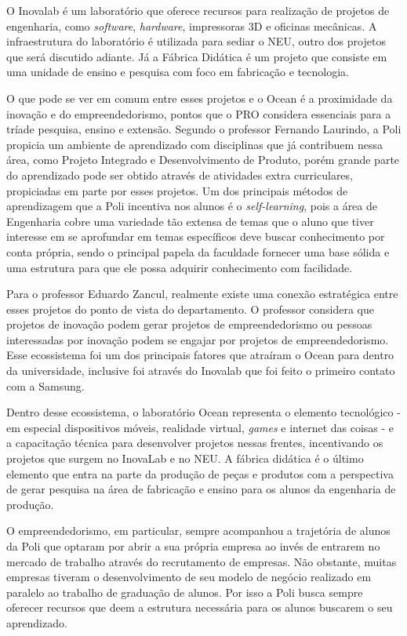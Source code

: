 O Inovalab é um laboratório que oferece recursos para realização de projetos de engenharia, como \textit{software}, \textit{hardware}, impressoras 3D e oficinas mecânicas. A infraestrutura do laboratório é utilizada para sediar o NEU, outro dos projetos que será discutido adiante. Já a Fábrica Didática é um projeto que consiste em uma unidade de ensino e pesquisa com foco em fabricação e tecnologia.

O que pode se ver em comum entre esses projetos e o Ocean é a proximidade da inovação e do empreendedorismo, pontos que o PRO considera essenciais para a tríade pesquisa, ensino e extensão. Segundo o professor Fernando Laurindo, a Poli propicia um ambiente de aprendizado com disciplinas que já contribuem nessa área, como Projeto Integrado e Desenvolvimento de Produto, porém grande parte do aprendizado pode ser obtido através de atividades extra curriculares, propiciadas em parte por esses projetos. Um dos principais métodos de aprendizagem que a Poli incentiva nos alunos é o \textit{self-learning}, pois a área de Engenharia cobre uma variedade tão extensa de temas que o aluno que tiver interesse em se aprofundar em temas específicos deve buscar conhecimento por conta própria, sendo o principal papela da faculdade fornecer uma base sólida e uma estrutura para que ele possa adquirir conhecimento com facilidade.

Para o professor Eduardo Zancul, realmente existe uma conexão estratégica entre esses projetos do ponto de vista do departamento. O professor considera que projetos de inovação podem gerar projetos de empreendedorismo ou pessoas interessadas por inovação podem se engajar por projetos de empreendedorismo. Esse ecossistema foi um dos principais fatores que atraíram o Ocean para dentro da universidade, inclusive foi através do Inovalab que foi feito o primeiro contato com a Samsung. 

Dentro desse ecossistema, o laboratório Ocean representa o elemento tecnológico - em especial dispositivos móveis, realidade virtual, \textit{games} e internet das coisas - e a capacitação técnica para desenvolver projetos nessas frentes, incentivando os projetos que surgem no InovaLab e no NEU. A fábrica didática é o último elemento que entra na parte da produção de peças e produtos com a perspectiva de gerar pesquisa na área de fabricação e ensino para os alunos da engenharia de produção.

O empreendedorismo, em particular, sempre acompanhou a trajetória de alunos da Poli que optaram por abrir a sua própria empresa ao invés de entrarem no mercado de trabalho através do recrutamento de empresas. Não obstante, muitas empresas tiveram o desenvolvimento de seu modelo de negócio realizado em paralelo ao trabalho de graduação de alunos. Por isso a Poli busca sempre oferecer recursos que deem a estrutura necessária para os alunos buscarem o seu aprendizado.

